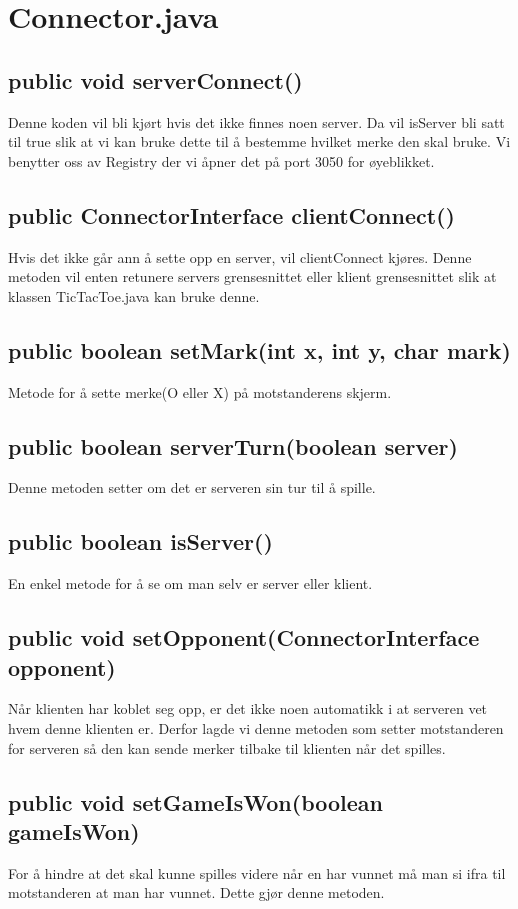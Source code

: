 \documentclass[11pt, a4paper]{article}	%
\begin{document}
\section{Connector.java}
\subsection*{public void serverConnect()}
Denne koden vil bli kjørt hvis det ikke finnes noen server. Da vil isServer bli satt til true slik at vi kan bruke dette til å bestemme hvilket merke den skal bruke. Vi benytter oss av Registry der vi åpner det på port 3050 for øyeblikket.
\subsection*{public ConnectorInterface clientConnect()}
Hvis det ikke går ann å sette opp en server, vil clientConnect kjøres. Denne metoden vil enten retunere servers grensesnittet eller klient grensesnittet slik at klassen TicTacToe.java kan bruke denne.


\subsection*{public boolean setMark(int x, int y, char mark)}
Metode for å sette merke(O eller X) på motstanderens skjerm.
\subsection*{public boolean serverTurn(boolean server)}
Denne metoden setter om det er serveren sin tur til å spille.
\subsection*{public boolean isServer()}
En enkel metode for å se om man selv er server eller klient.
\subsection*{public void setOpponent(ConnectorInterface opponent)}
Når klienten har koblet seg opp, er det ikke noen automatikk i at serveren vet hvem denne klienten er. Derfor lagde vi denne metoden som setter motstanderen for serveren så den kan sende merker tilbake til klienten når det spilles.
\subsection*{public void setGameIsWon(boolean gameIsWon)}
For å hindre at det skal kunne spilles videre når en har vunnet må man si ifra til motstanderen at man har vunnet. Dette gjør denne metoden.
\end{document}
